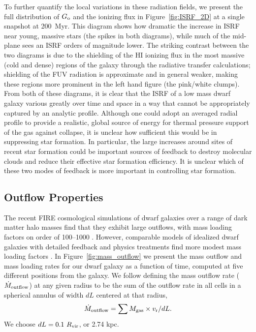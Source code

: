 \documentclass[twocolumn]{aastex61}
\begin{document}
To further quantify the local variations in these radiation fields, we present the full distribution of $G_{\rm o}$ and the  ionizing flux in Figure~\ref{fig:ISRF_2D} at a single snapshot at 200~Myr. This diagram shows how dramatic the increase in ISRF near young, massive stars (the spikes in both diagrams), while much of the mid-plane sees an ISRF orders of magnitude lower. The striking contrast between the two diagrams is due to the shielding of the HI ionizing flux in the most massive (cold and dense) regions of the galaxy through the radiative transfer calculations; shielding of the FUV radiation is approximate and in general weaker, making these regions more prominent in the left hand figure (the pink/white clumps). From both of these diagrams, it is clear that the ISRF of a low mass dwarf galaxy various greatly over time and space in a way that cannot be appropriately captured by an analytic profile. Although one could adopt an averaged radial profile to provide a realistic, global source of energy for thermal pressure support of the gas against collapse, it is unclear how sufficient this would be in suppressing star formation. In particular, the large increases around sites of recent star formation could be important sources of feedback to destroy molecular clouds and reduce their effective star formation efficiency. It is unclear which of these two modes of feedback is more important in controlling star formation.


\subsection{Outflow Properties}
\label{sec:outflows}

The recent FIRE cosmological simulations of dwarf galaxies over a range of dark matter halo masses find that they exhibit large outflows, with mass loading factors on order of 100--1000 \citep{Muratov2015}. However, comparable models of idealized dwarf galaxies with detailed feedback and physics treatments find more modest mass loading factors \citep{Hu2016,Hu2017}. In Figure~\ref{fig:mass_outflow} we present the mass outflow and mass loading rates for our dwarf galaxy as a function of time, computed at five different positions from the galaxy. We follow \citet{Muratov2015} defining the mass outflow rate ($\dot{M}_{\rm outflow}$) at any given radius to be the sum of the outflow rate in all cells in a spherical annulus of width $dL$ centered at that radius,
\begin{equation} \label{eq:dotM}
\dot{M}_{\rm outflow} = \sum M_{\rm gas} \times v_{\rm r} / dL.
\end{equation} 
We choose $dL = 0.1~R_{\rm vir}$, or 2.74 kpc. 
\end{document}
